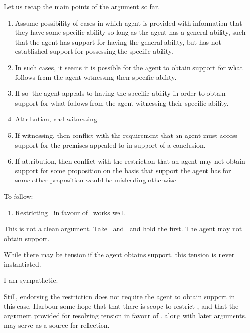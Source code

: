 \begin{note}
  Let us recap the main points of the argument so far.
  \begin{enumerate}
  \item Assume possibility of cases in which agent is provided with information that they have some specific ability so long as the agent has a general ability, such that the agent has support for having the general ability, but has not established support for possessing the specific ability.
  \item In such cases, it seems it is possible for the agent to obtain support for what follows from the agent witnessing their specific ability.
  \item If so, the agent appeals to having the specific ability in order to obtain support for what follows from the agent witnessing their specific ability.
  \item Attribution, and witnessing.
  \item If witnessing, then conflict with the requirement that an agent must access support for the premises appealed to in support of a conclusion.
  \item If attribution, then conflict with the restriction that an agent may not obtain support for some proposition on the basis that support the agent has for some other proposition would be misleading otherwise.
  \end{enumerate}

  To follow:
  \begin{enumerate}
  \item Restricting~\ESU{} in favour of~\EAS{} works well.
  \end{enumerate}
\end{note}

\begin{note}
  This is not a clean argument.
  Take~\ESU{} and~\nI{} and hold the first.
  The agent may not obtain support.

  While there may be tension if the agent obtains support, this tension is never instantiated.

  I am sympathetic.

  Still, endorsing the restriction does not require the agent to obtain support in this case.
  Harbour some hope that that there is scope to restrict \ESU{}, and that the argument provided for resolving tension in favour of \EAS{}, along with later arguments, may serve as a source for reflection.
\end{note}

